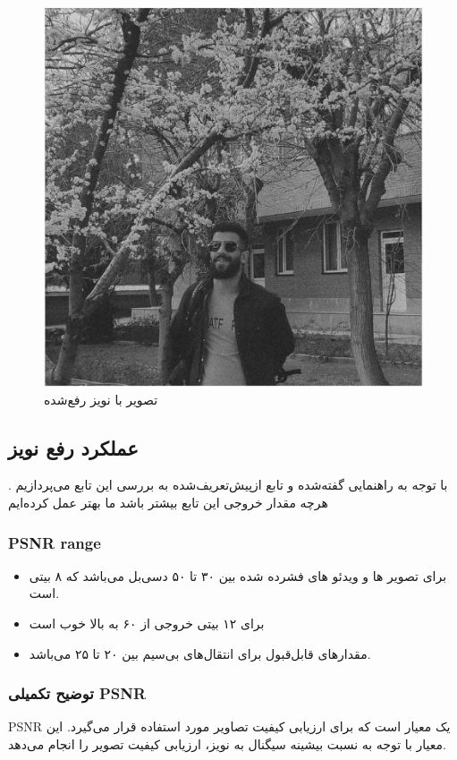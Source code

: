 \begin{figure}[H]
    \centering
    \includegraphics[width=0.65\linewidth]{images/removedNoise.jpg}
    \caption{ تصویر با نویز رفع‌شده }
    \label{fig:h}
\end{figure}

\subsection{عملکرد رفع نویز }
با توجه به راهنمایی گفته‌شده و تابع ازپیش‌تعریف‌شده 
به بررسی این تابع می‌پردازیم
.
هرچه مقدار خروجی این تابع بیشتر باشد ما بهتر عمل کرده‌ایم
\subsubsection{PSNR range}
\begin{itemize}
    \item برای تصویر ها و ویدئو های فشرده شده بین 
    ۳۰ تا ۵۰ دسی‌بل می‌باشد
    که ۸ بیتی است.
    \item برای ۱۲ بیتی خروجی از ۶۰ به بالا خوب است
    \item مقدارهای قابل‌قبول برای انتقال‌های بی‌سیم بین ۲۰ تا ۲۵ می‌باشد.
\end{itemize}
\lr{}


\subsubsection{توضیح تکمیلی PSNR}
PSNR یک معیار است که برای ارزیابی کیفیت تصاویر مورد استفاده قرار می‌گیرد. این معیار با توجه به نسبت بیشینه سیگنال به نویز، ارزیابی کیفیت تصویر را انجام می‌دهد.

